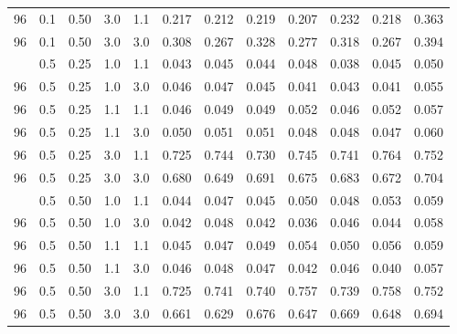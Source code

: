 \begin{longtable}[t]{cccccrrrrrrc}
96 & 0.1 & 0.50 & 3.0 & 1.1 & 0.217 & 0.212 & 0.219 & 0.207 & 0.232 & 0.218 & 0.363\\
96 & 0.1 & 0.50 & 3.0 & 3.0 & 0.308 & 0.267 & 0.328 & 0.277 & 0.318 & 0.267 & 0.394\\
\addlinespace
96 & 0.5 & 0.25 & 1.0 & 1.1 & 0.043 & 0.045 & 0.044 & 0.048 & 0.038 & 0.045 & 0.050\\
96 & 0.5 & 0.25 & 1.0 & 3.0 & 0.046 & 0.047 & 0.045 & 0.041 & 0.043 & 0.041 & 0.055\\
96 & 0.5 & 0.25 & 1.1 & 1.1 & 0.046 & 0.049 & 0.049 & 0.052 & 0.046 & 0.052 & 0.057\\
96 & 0.5 & 0.25 & 1.1 & 3.0 & 0.050 & 0.051 & 0.051 & 0.048 & 0.048 & 0.047 & 0.060\\
96 & 0.5 & 0.25 & 3.0 & 1.1 & 0.725 & 0.744 & 0.730 & 0.745 & 0.741 & 0.764 & 0.752\\
96 & 0.5 & 0.25 & 3.0 & 3.0 & 0.680 & 0.649 & 0.691 & 0.675 & 0.683 & 0.672 & 0.704\\
\addlinespace
96 & 0.5 & 0.50 & 1.0 & 1.1 & 0.044 & 0.047 & 0.045 & 0.050 & 0.048 & 0.053 & 0.059\\
96 & 0.5 & 0.50 & 1.0 & 3.0 & 0.042 & 0.048 & 0.042 & 0.036 & 0.046 & 0.044 & 0.058\\
96 & 0.5 & 0.50 & 1.1 & 1.1 & 0.045 & 0.047 & 0.049 & 0.054 & 0.050 & 0.056 & 0.059\\
96 & 0.5 & 0.50 & 1.1 & 3.0 & 0.046 & 0.048 & 0.047 & 0.042 & 0.046 & 0.040 & 0.057\\
96 & 0.5 & 0.50 & 3.0 & 1.1 & 0.725 & 0.741 & 0.740 & 0.757 & 0.739 & 0.758 & 0.752\\
96 & 0.5 & 0.50 & 3.0 & 3.0 & 0.661 & 0.629 & 0.676 & 0.647 & 0.669 & 0.648 & 0.694\\
\bottomrule
\end{longtable}
\endgroup{}
